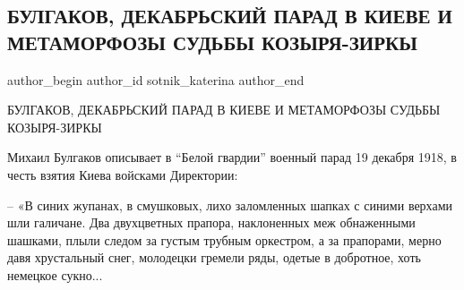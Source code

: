  
 
 
 
 
 
\subsection{БУЛГАКОВ, ДЕКАБРЬСКИЙ ПАРАД В КИЕВЕ И МЕТАМОРФОЗЫ СУДЬБЫ КОЗЫРЯ-ЗИРКЫ}
\label{sec:07_11_2019.fb.sotnik_katerina.1.bulgakov_parad_kiev}
 
\ifcmt
 author_begin
   author_id sotnik_katerina
 author_end
\fi

БУЛГАКОВ, ДЕКАБРЬСКИЙ ПАРАД В КИЕВЕ И МЕТАМОРФОЗЫ СУДЬБЫ КОЗЫРЯ-ЗИРКЫ 

Михаил Булгаков описывает в \enquote{Белой гвардии} военный парад 19 декабря 1918, в
честь взятия Киева войсками Директории:

– «В синих жупанах, в смушковых, лихо заломленных шапках с синими верхами шли
галичане. Два двухцветных прапора, наклоненных меж обнаженными шашками, плыли
следом за густым трубным оркестром, а за прапорами, мерно давя хрустальный
снег, молодецки гремели ряды, одетые в добротное, хоть немецкое сукно...

